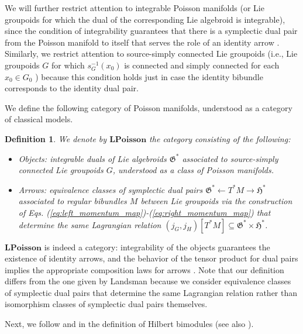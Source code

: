 \documentclass[sn-mathphys,Numbered]{sn-jnl}
\newtheorem{definition}{Definition}%
\begin{document}
We will further restrict attention to integrable Poisson manifolds (or Lie groupoids for which the dual of the corresponding Lie algebroid is integrable), since the condition of integrability guarantees that there is a symplectic dual pair from the Poisson manifold to itself that serves the role of an identity arrow \citep{La01b,CrFe04}.  Similarly, we restrict attention to source-simply connected Lie groupoids (i.e., Lie groupoids $G$ for which $s_G^{-1}(x_0)$ is connected and simply connected for each $x_0\in G_0$ \citep{MoMr02}) because this condition holds just in case the identity bibundle corresponds to the identity dual pair.



We define the following category of Poisson manifolds, understood as a category of classical models.\bigskip

\begin{definition}
    We denote by $\mathbf{LPoisson}$ the category consisting of the following:
    \begin{itemize}
        \item \emph{Objects}: integrable duals of Lie algebroids $\mathfrak{G}^*$ associated to source-simply connected Lie groupoids $G$, understood as a class of Poisson manifolds.
        \item \emph{Arrows}: equivalence classes of symplectic dual pairs $\mathfrak{G}^*\leftarrow T^*M\rightarrow\mathfrak{H}^*$ associated to regular bibundles $M$ between Lie groupoids via the construction of Eqs. (\ref{eq:left_momentum_map})-(\ref{eq:right_momentum_map}) that determine the same Lagrangian relation $(j_G,j_H)[T^*M]\subseteq \mathfrak{G}^*\times\mathfrak{H}^*$.
    \end{itemize}
\end{definition}

\noindent $\mathbf{LPoisson}$ is indeed a category: integrability of the objects guarantees the existence of identity arrows, and the behavior of the tensor product for dual pairs implies the appropriate composition laws for arrows \citep{La01b,La01c}.  Note that our definition differs from the one given by Landsman because we consider equivalence classes of symplectic dual pairs that determine the same Lagrangian relation rather than isomorphism classes of symplectic dual pairs themselves.

Next, we follow \citet{La95} and \citet{RaWi98} in the definition of Hilbert bimodules (see also \citet{Ri74,Ri74a,Ri72a}).\bigskip
\end{document}
